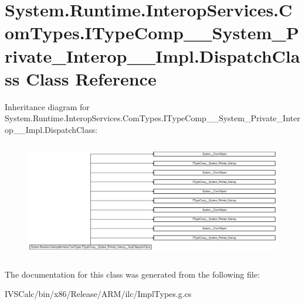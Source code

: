 \hypertarget{class_system_1_1_runtime_1_1_interop_services_1_1_com_types_1_1_i_type_comp_____system___private1d8691814c6cc29f5c57207b5859c674}{}\section{System.\+Runtime.\+Interop\+Services.\+Com\+Types.\+I\+Type\+Comp\+\_\+\+\_\+\+System\+\_\+\+Private\+\_\+\+Interop\+\_\+\+\_\+\+Impl.\+Dispatch\+Class Class Reference}
\label{class_system_1_1_runtime_1_1_interop_services_1_1_com_types_1_1_i_type_comp_____system___private1d8691814c6cc29f5c57207b5859c674}
Inheritance diagram for System.\+Runtime.\+Interop\+Services.\+Com\+Types.\+I\+Type\+Comp\+\_\+\+\_\+\+System\+\_\+\+Private\+\_\+\+Interop\+\_\+\+\_\+\+Impl.\+Dispatch\+Class\+:\begin{figure}[H]
\begin{center}
\leavevmode
\includegraphics[height=5.150502cm]{class_system_1_1_runtime_1_1_interop_services_1_1_com_types_1_1_i_type_comp_____system___private1d8691814c6cc29f5c57207b5859c674}
\end{center}
\end{figure}


The documentation for this class was generated from the following file\+:\begin{DoxyCompactItemize}
\item 
I\+V\+S\+Calc/bin/x86/\+Release/\+A\+R\+M/ilc/Impl\+Types.\+g.\+cs\end{DoxyCompactItemize}
